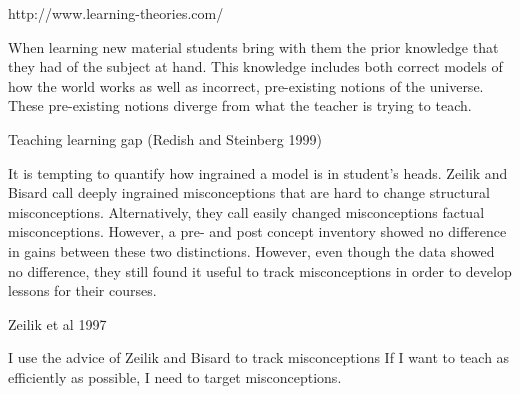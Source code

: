 http://www.learning-theories.com/

When learning new material students bring with them the prior knowledge that they had of the subject at hand. This knowledge includes both correct models of how the world works as well as incorrect, pre-existing notions of the universe. These pre-existing notions diverge from what the teacher is trying to teach.

Teaching learning gap (Redish and Steinberg 1999)

It is tempting to quantify how ingrained a model is in student's heads. Zeilik and Bisard call deeply ingrained misconceptions that are hard to change structural misconceptions. Alternatively, they call easily changed misconceptions factual misconceptions\cite{zeilik2000}. However, a pre- and post concept inventory showed no difference in gains between these two distinctions. However, even though the data showed no difference, they still found it useful to track misconceptions in order to develop lessons for their courses.

Zeilik et al 1997

I use the advice of Zeilik and  Bisard to track misconceptions\cite{zeilik2000}
If I want to teach as efficiently as possible, I need to target misconceptions.